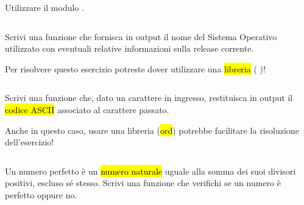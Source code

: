 \documentclass[a4paper,11pt,addpoints]{exam}
\begin{document}
\begin{questions}
    \begin{tips}
        \item Utilizzare il modulo .
    \end{tips}

    \begin{solution}
        \small\inputminted{python}{solution/015.py}
    \end{solution}

    \questionspace

    \question[2]  Scrivi una funzione che fornisca in output il nome del Sistema Operativo utilizzato
    con eventuali relative informazioni sulla release corrente.

    \begin{tips}
        \item Per risolvere questo esercizio potreste dover utilizzare una \hl{libreria} ( )!
    \end{tips}

    \begin{solution}
        \small\inputminted{python}{solution/016.py}
    \end{solution}

    \questionspace

    \question[2]  Scrivi una funzione che, dato un carattere in ingresso, restituisca in output il \hl{codice ASCII}
    associato al carattere passato.

    \begin{tips}
        \item Anche in questo caso, usare una libreria (\hl{ord}) potrebbe facilitare la risoluzione dell'esercizio!
    \end{tips}

    \begin{solution}
        \small\inputminted{python}{solution/017.py}
    \end{solution}

    \questionspace

    \question[9]  Un numero perfetto è un \hl{numero naturale} uguale alla somma dei suoi divisori positivi,
    escluso sé stesso. Scrivi una funzione che verifichi se un numero è perfetto oppure no.

    \begin{solution}
        \small\inputminted{python}{solution/018.py}
    \end{solution}


\end{questions}
\end{document}
